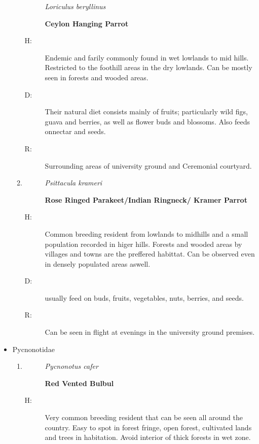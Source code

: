 \begin{itemize}
\begin{enumerate}
\begin{description}%
\item[]%
\textit{Loriculus beryllinus}%
\item[]%
\textbf{Ceylon Hanging Parrot}%
\end{description}%
\begin{description}%
\item[H: ]%
Endemic and farily commonly found in wet lowlands to mid hills. Restricted to the foothill areas in the dry lowlands. Can be mostly seen in forests and wooded areas.%
\item[D: ]%
Their natural diet consists mainly of fruits; particularly wild figs, guava and berries, as well as flower buds and blossoms. Also feeds onnectar and seeds.%
\item[R: ]%
Surrounding areas of university ground and Ceremonial courtyard.%
\end{description}%
\item%
\begin{description}%
\item[]%
\textit{Psittacula krameri}%
\item[]%
\textbf{Rose Ringed Parakeet/Indian Ringneck/ Kramer Parrot}%
\end{description}%
\begin{description}%
\item[H: ]%
Common breeding resident from lowlands to midhills and a small population recorded in higer hills. Forests and wooded areas by villages and towns are the preffered habittat. Can be observed even in densely populated areas aswell.%
\item[D: ]%
usually feed on buds, fruits, vegetables, nuts, berries, and seeds.%
\item[R: ]%
Can be seen in flight at evenings in the university ground premises.%
\end{description}%
\end{enumerate}%
\item%
Pycnonotidae%
\begin{enumerate}%
\item%
\begin{description}%
\item[]%
\textit{Pycnonotus cafer}%
\item[]%
\textbf{Red Vented Bulbul}%
\end{description}%
\begin{description}%
\item[H: ]%
Very common breeding resident that can be seen all around the country. Easy to spot in forest fringe, open forest, cultivated lands and trees in habitation.  Avoid interior of thick forests in wet zone.%

\end{description}
\end{enumerate}
\end{itemize}
